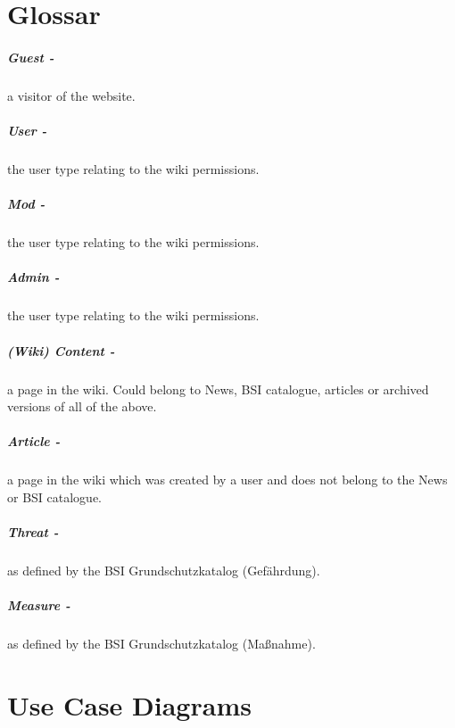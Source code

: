 \appendix
\chapter{Glossar}

\paragraph{Guest -} a visitor of the website.
\paragraph{User -} the user type relating to the wiki permissions.
\paragraph{Mod -} the user type relating to the wiki permissions. 
\paragraph{Admin -} the user type relating to the wiki permissions. 
\paragraph{(Wiki) Content -} a page in the wiki. Could belong to News, BSI catalogue, articles or archived versions of all of the above.
\paragraph{Article -} a page in the wiki which was created by a user and does not belong to the News or BSI catalogue.
\paragraph{Threat -} as defined by the BSI Grundschutzkatalog (Gef\"ahrdung).
\paragraph{Measure -} as defined by the BSI Grundschutzkatalog (Ma\ss nahme).

\chapter{Use Case Diagrams}

